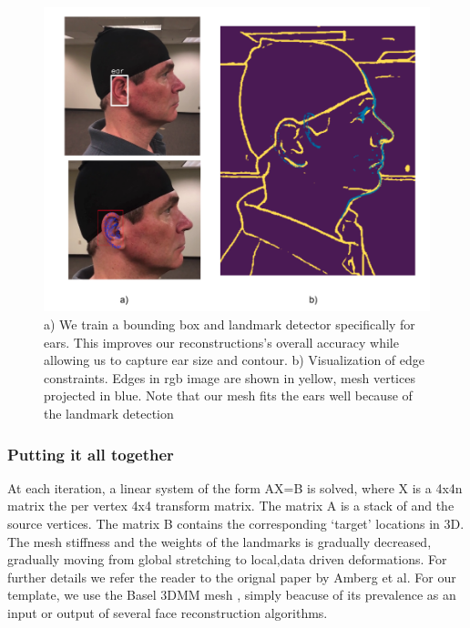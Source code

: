 \documentclass[10pt,twocolumn,letterpaper]{article}
\begin{document}
\begin{figure}[t]
\begin{center}
   \includegraphics[width=0.95\linewidth]{images/ear_lm_and_edges.png}
\end{center}
   \caption{ a) We train a bounding box and landmark detector specifically for ears. This improves our reconstructions's overall accuracy while allowing us to capture ear size and contour. b) Visualization of edge constraints. Edges in rgb image are shown in yellow, mesh vertices projected in blue. Note that our mesh fits the ears well because of the landmark detection }
\label{fig:ear_lm_and_edges}
\end{figure}


 \subsubsection{Putting it all together}
 
 
 At each iteration, a linear system of the form AX=B is solved, where X is a 4x4n matrix the per vertex 4x4 transform matrix. The matrix A is a stack of  and the source vertices. The matrix B contains the corresponding `target' locations in 3D. The mesh stiffness and the weights of the landmarks is gradually decreased, gradually moving from global stretching to local,data driven deformations. For further details we refer the reader to the orignal paper by Amberg et al. For our template, we use the Basel 3DMM mesh \cite{blanz1999morphable}, simply beacuse of its prevalence as an input or output of several face reconstruction algorithms.

\end{document}
